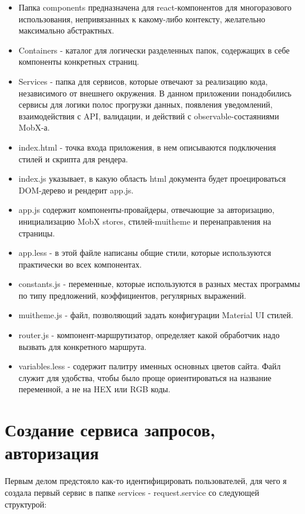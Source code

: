 \documentclass[a4paper,12pt]{diplom}
\begin{document}
\begin{itemize}
  \item Папка components предназначена для react-компонентов для многоразового использования, непривязанных к какому-либо контексту, желательно максимально абстрактных.
  \item Containers - каталог для логически разделенных папок, содержащих в себе компоненты конкретных страниц.
  \item Services - папка для сервисов, которые отвечают за реализацию кода, независимого от внешнего окружения. В данном приложении понадобились сервисы для логики полос прогрузки данных, появления уведомлений, взаимодействия с API, валидации, и действий с observable-состаяниями MobX-а.
  \item index.html - точка входа приложения, в нем описываются подключения стилей и скрипта для рендера.
  \item index.js указывает, в какую область html документа будет проецироваться DOM-дерево и рендерит app.js.
  \item app.js содержит компоненты-провайдеры, отвечающие за авторизацию, инициализацию MobX stores, стилей-muitheme и перенаправления на страницы.
  \item app.less - в этой файле написаны общие стили, которые используются практически во всех компонентах.
  \item constants.js - переменные, которые используются в разных местах программы по типу предложений, коэффициентов, регулярных выражений.
  \item muitheme.js - файл, позволяющий задать конфигурации Material UI стилей.
  \item router.js - компонент-маршрутизатор, определяет какой обработчик надо вызвать для конкретного маршрута.
  \item variables.less - содержит палитру именных основных цветов сайта. Файл служит для удобства, чтобы было проще ориентироваться на название переменной, а не на HEX или RGB коды.
\end{itemize}

\section{Создание сервиса запросов, авторизация}

Первым делом предстояло как-то идентифицировать пользователей, для чего я создала первый сервис в папке services - request.service со следующей структурой: 
\medskip
{}
\medskip
\end{document}
